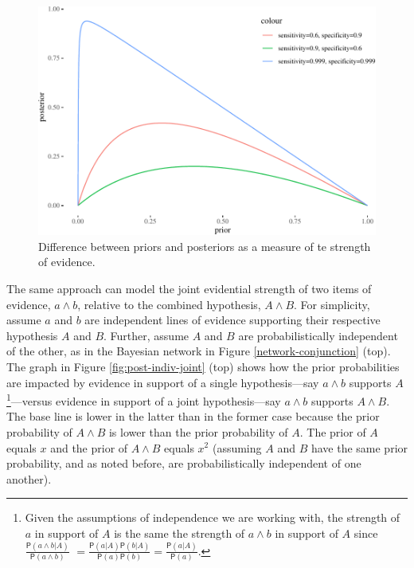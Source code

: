\documentclass[
  10pt,
  dvipsnames,enabledeprecatedfontcommands]{scrartcl}
\newcommand{\pr}[1]{\mathsf{P}(#1)}
\begin{document}
\begin{figure}


\begin{center}\includegraphics[width=0.9\linewidth]{conjunction-paradox_files/figure-latex/unnamed-chunk-8-1} \end{center}

\caption{Difference between priors and posteriors as a measure of te strength of evidence.}
\label{fig:strength-difference}

\end{figure}

The same approach can model the joint evidential strength of two items
of evidence, \(a \wedge b\), relative to the combined hypothesis,
\(A \wedge B\). For simplicity, assume \(a\) and \(b\) are independent
lines of evidence supporting their respective hypothesis \(A\) and
\(B\). Further, assume \(A\) and \(B\) are probabilistically independent
of the other, as in the Bayesian network in Figure
\ref{network-conjunction} (top). The graph in Figure
\ref{fig:post-indiv-joint} (top) shows how the prior probabilities are
impacted by evidence in support of a single hypothesis---say
\(a\wedge b\) supports
\(A\)\footnote{Given the assumptions of independence we are working with, the strength of $a$ in support of $A$ is the same the strength of 
$a\wedge b$ in support of $A$ since $\frac{\pr{a\wedge b \vert A}}{\pr{a \wedge b}}$ $=\frac{\pr{a \vert A}\pr{b \vert A}}{\pr{a}\pr{b}}=\frac{\pr{a \vert A}}{\pr{a}}$.}---versus
evidence in support of a joint hypothesis---say \(a\wedge b\) supports
\(A \wedge B\). The base line is lower in the latter than in the former
case because the prior probability of \(A \wedge B\) is lower than the
prior probability of \(A\). The prior of \(A\) equals \(x\) and the
prior of \(A\wedge B\) equals \(x^2\) (assuming \(A\) and \(B\) have the
same prior probability, and as noted before, are probabilistically
independent of one another).
\end{document}
